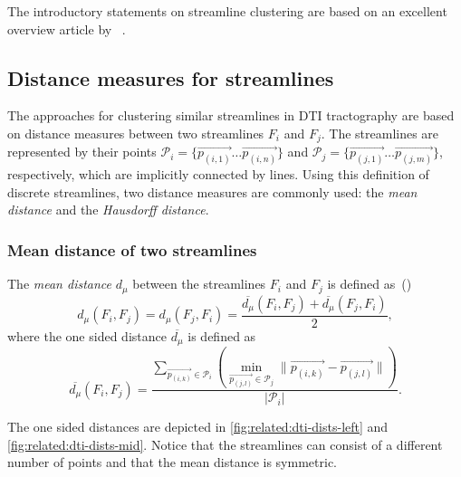 The introductory statements on streamline clustering are based on an excellent overview article by ~\cite{Schultz}.


\subsection{Distance measures for streamlines}

The approaches for clustering similar streamlines in \ac{DTI} tractography are based on distance measures between two streamlines $F_i$ and $F_j$. The streamlines are represented by their points $\mathcal P_i = \{\vec{p_{(i,1)}}\dots \vec{p_{(i,n)}}\}$ and $\mathcal P_j = \{\vec{p_{(j,1)}}\dots \vec{p_{(j,m)}}\}$, respectively, which are implicitly connected by lines. Using this definition of discrete streamlines, two distance measures are commonly used: the \emph{mean distance} and the \emph{Hausdorff distance}.


\subsubsection{Mean distance of two streamlines}

The \emph{mean distance} $d_\mu$ between the streamlines $F_i$ and $F_j$ is defined as~(\cite[notation adapted]{Schultz})
%
\begin{equation}
  d_\mu(F_i, F_j) = d_\mu(F_j, F_i) = \frac{\overline{d_\mu}(F_i, F_j) + \overline{d_\mu}(F_j, F_i)}{2},
\end{equation}
%
where the one sided distance $\overline{d_\mu}$ is defined as
%
\begin{equation}
	\overline{d_{\mu}}(F_i, F_j) = \frac{
	  \sum\limits_{\vec{p_{(i,k)}}\in \mathcal P_i}\left(
	    \min\limits_{\vec{p_{(j,l)}}\in \mathcal P_j}{\|\vec{p_{(i,k)}} - \vec{p_{(j,l)}}\|}
	  \right)}{|\mathcal P_i|}.
\end{equation}


The one sided distances are depicted in \autoref{fig:related:dti-dists-left} and \autoref{fig:related:dti-dists-mid}. Notice that the streamlines can consist of a different number of points and that the mean distance is symmetric.

